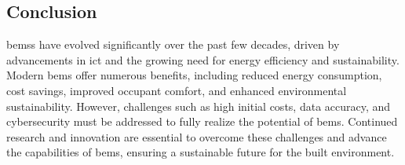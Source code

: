 \begin{table}[h!]
    \centering
    \caption{Modeling Support offered by Brick, Project Haystack, \gls{ifc}, \gls{saref} (\href{https://docs.brickschema.org/intro.html}{Brick Ontology Documentation})}
    \label{tab:ontology-comparison-from-brick-ontology-documentation}
\end{table}

\subsection*{Conclusion}
\glspl{bems} have evolved significantly over the past few decades, driven by advancements in \gls{ict} and the growing need for energy efficiency and sustainability.
Modern \gls{bems} offer numerous benefits, including reduced energy consumption, cost savings, improved occupant comfort, and enhanced environmental sustainability.
However, challenges such as high initial costs, data accuracy, and cybersecurity must be addressed to fully realize the potential of \gls{bems}.
Continued research and innovation are essential to overcome these challenges and advance the capabilities of \gls{bems}, ensuring a sustainable future for the built environment.